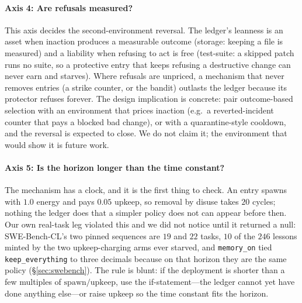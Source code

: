 \paragraph{Axis 4: Are refusals measured?}
This axis decides the second-environment reversal. The ledger's leanness
is an asset when inaction produces a measurable outcome (storage: keeping
a file is measured) and a liability when refusing to act is free
(test-suite: a skipped patch runs no suite, so a protective entry that
keeps refusing a destructive change can never earn and starves). Where
refusals are unpriced, a mechanism that never removes entries (a strike
counter, or the bandit) outlasts the ledger because its protector refuses
forever. The design implication is concrete: pair outcome-based
selection with an environment that prices inaction (e.g.\ a
reverted-incident counter that pays a blocked bad change), or with a
quarantine-style cooldown, and the reversal is expected to close. We do
not claim it; the environment that would show it is future work.

\paragraph{Axis 5: Is the horizon longer than the time constant?}
The mechanism has a clock, and it is the first thing to check. An entry
spawns with $1.0$ energy and pays $0.05$ upkeep, so removal by disuse
takes $20$ cycles; nothing the ledger does that a simpler policy does not
can appear before then. Our own real-task leg violated this and we did
not notice until it returned a null: SWE-Bench-CL's two pinned sequences
are $19$ and $22$ tasks, $10$ of the $246$ lessons minted by the two
upkeep-charging arms ever starved, and
\texttt{memory\_on} tied \texttt{keep\_everything} to three decimals
because on that horizon they are the same policy
(\S\ref{sec:swebench}). The rule is blunt: if the deployment is shorter
than a few multiples of $\textrm{spawn}/\textrm{upkeep}$, use the
if-statement---the ledger cannot yet have done anything else---or raise
upkeep so the time constant fits the horizon.

